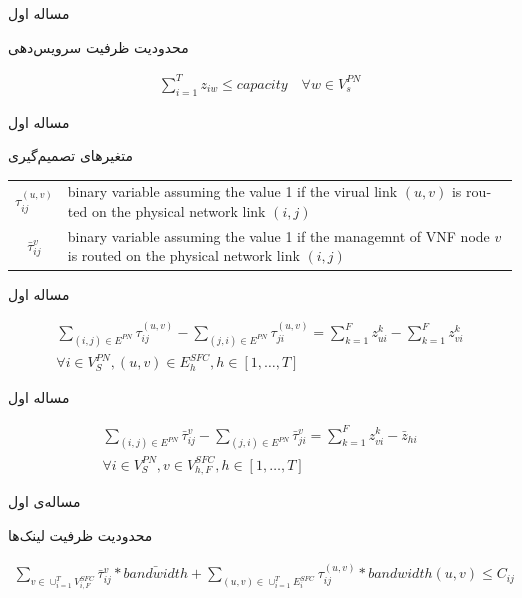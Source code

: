 \documentclass{beamer}
\begin{document}
\begin{persian}
\begin{frame}{مساله اول}
    \par
    محدودیت ظرفیت سرویس‌دهی 
    \begin{latin}\begin{align}
        \sum_{i=1}^{T} z_{iw} \le capacity
        \quad
        \forall w \in V_{s}^{PN}
    \end{align}\end{latin}
\end{frame}
\begin{frame}{مساله اول}
    \par
    متغیرهای تصمیم‌گیری
    \begin{latin}\begin{tabular}{c p{10cm}}
        $\tau^{(u,v)}_{ij}$ & binary variable assuming the value 1 if the virual link $(u,v)$ is routed on the physical network link $(i,j)$\\
        $\bar{\tau}^{v}_{ij}$ & binary variable assuming the value 1 if the managemnt of VNF node $v$ is routed on the physical network link $(i,j)$\\
    \end{tabular}\end{latin}
\end{frame}
\begin{frame}{مساله اول}
    \par
    \begin{latin}\begin{align}
        \sum_{(i,j) \in E^{PN}} \tau_{ij}^{(u,v)} - \sum_{(j,i) \in E^{PN}} \tau_{ji}^{(u,v)} = \sum_{k=1}^{F} z_{ui}^{k} - \sum_{k=1}^{F} z_{vi}^{k} \nonumber \\
        \forall i \in V_{S}^{PN}, (u,v) \in E_{h}^{SFC}, h \in [1,\ldots, T]
    \end{align}\end{latin}
\end{frame}
\begin{frame}{مساله اول}
    \par
    \begin{latin}\begin{align}
        \sum_{(i,j) \in E^{PN}} \bar{\tau}_{ij}^{v} - \sum_{(j,i) \in E^{PN}} \bar{\tau}_{ji}^{v} = \sum_{k=1}^{F} z_{vi}^{k} - \bar{z}_{hi} \nonumber \\
        \forall i \in V_{S}^{PN}, v \in V_{h, F}^{SFC}, h \in [1,\ldots, T]
    \end{align}\end{latin}
\end{frame}
\begin{frame}{مساله‌ی اول}
    \par
    محدودیت ظرفیت لینک‌ها
    \begin{latin}\begin{align}
        \sum_{v \in \cup_{i=1}^{T} V_{i,F}^{SFC}} \bar{\tau}_{ij}^{v} * \bar{bandwidth} + \sum_{(u,v) \in \cup_{i=1}^{T} E_{i}^{SFC}} \tau_{ij}^{(u,v)} * bandwidth(u,v) \le C_{ij}
    \end{align}\end{latin}
\end{frame}
\end{persian}
\end{document}
